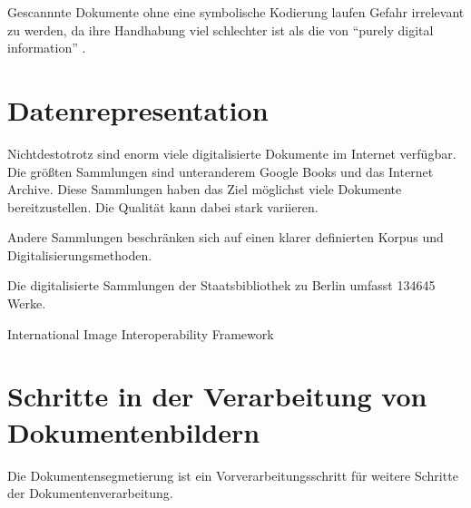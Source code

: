 Gescannnte Dokumente ohne eine symbolische Kodierung laufen Gefahr irrelevant zu werden,
da ihre Handhabung viel schlechter ist als die von ``purely digital information'' \parencite[10]{BairdDigitallibrariesdocument2003}.
 
\section{Datenrepresentation}

Nichtdestotrotz sind enorm viele digitalisierte Dokumente im Internet verfügbar.
Die größten Sammlungen sind unteranderem Google Books und das Internet Archive.
Diese Sammlungen haben das Ziel möglichst viele Dokumente bereitzustellen. 
Die Qualität kann dabei stark variieren.

Andere Sammlungen beschränken sich auf einen klarer definierten Korpus und Digitalisierungsmethoden.

Die digitalisierte Sammlungen der Staatsbibliothek zu Berlin \cite{StaatsbibliothekzuBerlinDigitalisierteSammlungenStaatsbibliothek2016} umfasst 134645 Werke.



International Image Interoperability Framework \cite{IIIFInternationalImageInteroperability2018}


\section{Schritte in der Verarbeitung von Dokumentenbildern}
Die Dokumentensegmetierung ist ein Vorverarbeitungsschritt für weitere Schritte der Dokumentenverarbeitung.
